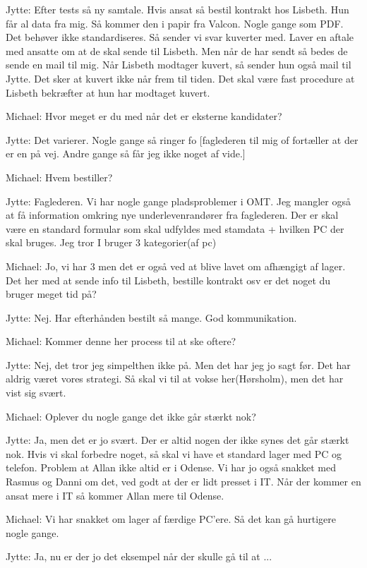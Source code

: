 \begin{linenumbers*}
Jytte:
Efter tests så ny samtale. Hvis ansat så bestil kontrakt hos Lisbeth.
Hun får al data fra mig.
Så kommer den i papir fra Valcon. Nogle gange som PDF.
Det behøver ikke standardiseres. 
Så sender vi svar kuverter med. Laver en aftale med ansatte
om at de skal sende til Lisbeth.
Men når de har sendt så bedes de sende en mail til mig. 
Når Lisbeth modtager kuvert, så sender hun også mail til Jytte.
Det sker at kuvert ikke når frem til tiden.
Det skal være fast procedure at Lisbeth bekræfter at hun har modtaget kuvert.

Michael:
Hvor meget er du med når det er eksterne kandidater?

Jytte:
Det varierer. Nogle gange så ringer fo
[faglederen til mig of fortæller at der er en på vej. 
Andre gange så får jeg ikke noget af vide.]

Michael:
Hvem bestiller?

Jytte:
Faglederen. Vi har nogle gange pladsproblemer i OMT.
Jeg mangler også at få information omkring nye underlevenrandører fra faglederen. 
Der er skal være en standard formular som skal udfyldes med stamdata
+ hvilken PC der skal bruges. 
Jeg tror I bruger 3 kategorier(af pc)

Michael:
Jo, vi har 3 men det er også ved at blive lavet om afhængigt af lager.
Det her med at sende info til Lisbeth,
bestille kontrakt osv er det noget du bruger meget tid på?

Jytte:
Nej. Har efterhånden bestilt så mange. God kommunikation.

Michael:
Kommer denne her process til at ske oftere?

Jytte:
Nej, det tror jeg simpelthen ikke på. Men det har jeg jo sagt før.
Det har aldrig været vores strategi.
Så skal vi til at vokse her(Hørsholm), men det har vist sig svært.

Michael:
Oplever du nogle gange det ikke går stærkt nok?

Jytte:
Ja, men det er jo svært. Der er altid nogen der ikke synes det går stærkt nok.
Hvis vi skal forbedre noget, så skal vi have et standard lager med PC og telefon.
Problem at Allan ikke altid er i Odense.
Vi har jo også snakket med Rasmus og Danni om det, ved godt at der er lidt presset i IT.
Når der kommer en ansat mere i IT så kommer Allan mere til Odense.

Michael:
Vi har snakket om lager af færdige PC’ere. Så det kan gå hurtigere nogle gange.

Jytte:
Ja, nu er der jo det eksempel når der skulle gå til at ...


\end{linenumbers*}
